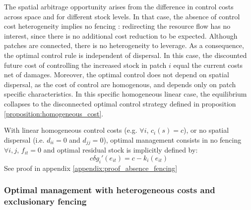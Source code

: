 The spatial arbitrage opportunity arises from the difference in control costs across space and for different stock levels. In that case, the absence of control cost heterogeneity implies no fencing : redirecting the resource flow has no interest, since there is no additional cost reduction to be expected. Although patches are connected, there is no heterogeneity to leverage. As a consequence, the optimal control rule is independent of dispersal. 
 In this case, the discounted future cost of controlling the increased stock in patch $i$ equal the current costs net of damages. Moreover, the optimal control does not depend on spatial dispersal, as the cost of control are homogenous, and depends only on patch specific characteristics. In this specific homogeneous linear case, the equilibrium collapses to the disconnected optimal control strategy defined in proposition \ref{proposition:homogeneous_cost}.

\begin{proposition}
\label{proposition:homogeneous_cost}
With linear homogeneous control costs (e.g. $\forall i$, $c_i(s) = c$), or no spatial dispersal (i.e. $d_{ii} = 0$ and $d_{jj}=0$), optimal management consists in no fencing $\forall i, j$, $f_{it} = 0$ and optimal residual stock is implicitly defined by:
$$
		c \delta g_i'(e_{it}) = c - k_i(e_{it}) 
$$
See proof in appendix \ref{appendix:proof_absence_fencing}
\end{proposition} 


\subsubsection{Optimal management with heterogeneous costs and exclusionary fencing}
\label{sec:optimal_exclusionary}

